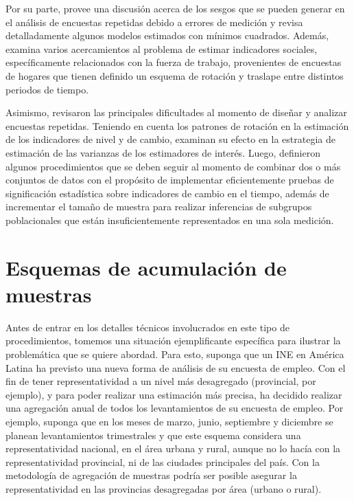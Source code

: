\documentclass[
  12pt,
]{book}
\begin{document}
Por su parte, \citet{Fuller_1990} provee una
discusión acerca de los sesgos que se pueden generar en el análisis de
encuestas repetidas debido a errores de medición y revisa detalladamente
algunos modelos estimados con mínimos cuadrados. Además, \citet{Bell_2001}
examina varios acercamientos al problema de estimar indicadores
sociales, específicamente relacionados con la fuerza de trabajo,
provenientes de encuestas de hogares que tienen definido un esquema de
rotación y traslape entre distintos periodos de tiempo.

Asimismo, \citet{Steel_McLaren_2008} revisaron las principales dificultades al
momento de diseñar y analizar encuestas repetidas. Teniendo en cuenta
los patrones de rotación en la estimación de los indicadores de nivel y
de cambio, examinan su efecto en la estrategia de estimación de las
varianzas de los estimadores de interés. Luego, \citet{Lewis_2017} definieron
algunos procedimientos que se deben seguir al momento de combinar dos o
más conjuntos de datos con el propósito de implementar eficientemente
pruebas de significación estadística sobre indicadores de cambio en el
tiempo, además de incrementar el tamaño de muestra para realizar
inferencias de subgrupos poblacionales que están insuficientemente
representados en una sola medición.

\hypertarget{esquemas-de-acumulaciuxf3n-de-muestras}{%
\section{Esquemas de acumulación de muestras}\label{esquemas-de-acumulaciuxf3n-de-muestras}}

Antes de entrar en los detalles técnicos involucrados en este tipo de
procedimientos, tomemos una situación ejemplificante específica para
ilustrar la problemática que se quiere abordad. Para esto, suponga que
un INE en América Latina ha previsto una
nueva forma de análisis de su encuesta de empleo. Con el fin de tener
representatividad a un nivel más desagregado (provincial, por ejemplo),
y para poder realizar una estimación más precisa, ha decidido realizar
una agregación anual de todos los levantamientos de su encuesta de
empleo. Por ejemplo, suponga que en los meses de marzo, junio,
septiembre y diciembre se planean levantamientos trimestrales y que este
esquema considera una representatividad nacional, en el área urbana y
rural, aunque no lo hacía con la representatividad provincial, ni de las
ciudades principales del país. Con la metodología de agregación de
muestras podría ser posible asegurar la representatividad en las
provincias desagregadas por área (urbano o rural).
\end{document}
